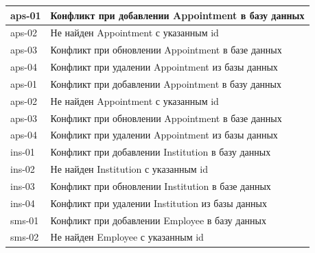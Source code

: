 \documentclass[a4paper,article]{article}
\begin{document}
\begin{sloppypar}
\begin{appendices}
\begin{xltabular}{\textwidth} { |
                >{\hsize} X |
                >{\hsize} X | }
            \hline
            aps-01
            & Конфликт при добавлении Appointment в базу данных \\
            
            \hline
            aps-02
            & Не найден Appointment с указанным id \\
            
            \hline
            aps-03
            & Конфликт при обновлении Appointment в базе данных \\
            
            \hline
            aps-04
            & Конфликт при удалении Appointment из базы данных \\
            
            \hline
            aps-01
            & Конфликт при добавлении Appointment в базу данных \\
            
            \hline
            aps-02
            & Не найден Appointment с указанным id \\
            
            \hline
            aps-03
            & Конфликт при обновлении Appointment в базе данных \\
            
            \hline
            aps-04
            & Конфликт при удалении Appointment из базы данных \\
            
            \hline
            ins-01
            & Конфликт при добавлении Institution в базу данных \\
            
            \hline
            ins-02
            & Не найден Institution с указанным id \\
            
            \hline
            ins-03
            & Конфликт при обновлении Institution в базе данных \\
            
            \hline
            ins-04
            & Конфликт при удалении Institution из базы данных \\
            
            \hline
            sms-01
            & Конфликт при добавлении Employee в базу данных \\
            
            \hline
            sms-02
            & Не найден Employee с указанным id \\
            

\end{xltabular}
\end{appendices}
\end{sloppypar}
\end{document}
